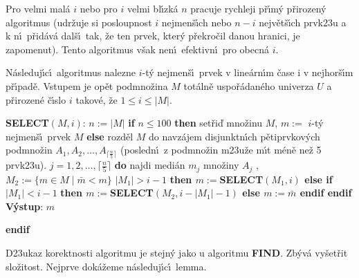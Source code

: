 \documentclass[a4paper,12pt]{article}
\begin{document}
\flushpar Pro velmi mal\'a $i$ nebo pro $i$ velmi bl\'\i zk\'a $n$ 
pracuje rychleji p\v r\'\i m\'y p\v rirozen\'y algoritmus (udr\v zuje si 
posloupnost $i$ nejmen\-\v s\'\i ch nebo $n-i$ nejv\v et\v s\'\i ch prvk\accent23u 
a k n\'\i\ p\v rid\'av\'a dal\v s\'\i\ tak, \v ze ten prvek, kter\'y p\v re\-kro\v cil 
danou hranici, je 
zapomenut). Tento algoritmus v\v sak nen\'\i\ 
efektivn\'\i\ pro obecn\'a $i$. 
\medskip

\flushpar N\'asleduj\'\i c\'\i\ algoritmus nalezne $i$-t\'y nejmen\v s\'\i\ 
prvek v line\'arn\'\i m \v case i v nejhor\v s\'\i m p\v r\'\i pad\v e.  Vstupem 
je op\v et podmno\v zina $M$ tot\'aln\v e 
uspo\v r\'adan\'eho univerza $U$ a p\v rirozen\'e \v c\'\i slo $i$ takov\'e, \v ze 
$1\le i\le |M|$.  
\medskip

{\bf SELECT$(M,i)$}:\newline 
$n:=|M|$\newline 
{\bf if} $n\le 100$ {\bf then\newline 
\phantom{{\rm---}}}set\v ri\v d mno\v zinu $M$, $m:=$ $i$-t\'y nejmen\v s\'\i\ 
prvek $M$\newline 
{\bf else\newline 
\phantom{{\rm---}}}rozd\v el $M$ do navz\'ajem disjunktn\'\i ch 
p\v etiprvkov\'ych podmno\v zin $A_1,A_2,\dots,A_{\lceil\frac n5\rceil}$\newline 
\phantom{---}(posledn\'\i\ z podmno\v zin m\accent23u\v ze m\'\i t m\'en\v e ne\v z 5 prvk\accent23u).\newline 
\phantom{---}{\bf for every} $j=1,2,\dots,\lceil\frac n5\rceil$ {\bf do\newline 
\phantom{{\rm------}}}najdi medi\'an $m_j$ mno\v ziny $A_j$\newline 
{}, $M_2:=\{m\in 
M\mid\bar {m}<m\}$\newline 
\phantom{---}{\bf if} $|M_1|>i-1$ {\bf then\newline 
\phantom{{\rm ------}}$m:=$SELECT$(M_1,i)$\newline 
\phantom{{\rm ---}}else\newline 
\phantom{{\rm------}}if} $|M_1|<i-1$ {\bf then\newline 
\phantom{{\rm ---------}}$m:=$SELECT$(M_2,i-|M_1|-1)$\newline 
\phantom{{\rm ------}}else\newline 
\phantom{{\rm ---------}}$m:=\bar {m}$\newline 
\phantom{{\rm ------}}endif\newline 
\phantom{{\rm ---}}endif\newline 
\phantom{{\rm ---}}V\'ystup}: $m$\newline 
{\bf endif
\medskip

}\flushpar D\accent23ukaz korektnosti algoritmu je stejn\'y 
jako u algoritmu {\bf FIND}. 
Zb\'yv\'a vy\v set\v rit slo\v zitost. Nej\-prve dok\'a\v zeme n\'asleduj\'\i c\'\i\ 
lemma.
\medskip
\end{document}
